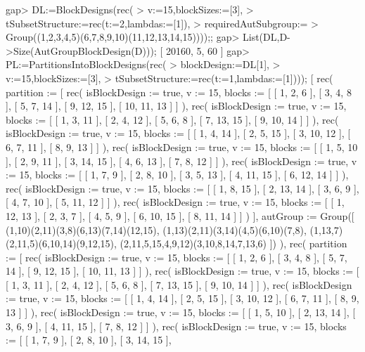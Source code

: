 \beginexample
gap> DL:=BlockDesigns(rec(
>    v:=15,blockSizes:=[3],
>    tSubsetStructure:=rec(t:=2,lambdas:=[1]),
>    requiredAutSubgroup:=
>       Group((1,2,3,4,5)(6,7,8,9,10)(11,12,13,14,15))));;
gap> List(DL,D->Size(AutGroupBlockDesign(D)));
[ 20160, 5, 60 ]
gap> PL:=PartitionsIntoBlockDesigns(rec(
>       blockDesign:=DL[1],
>       v:=15,blockSizes:=[3],
>       tSubsetStructure:=rec(t:=1,lambdas:=[1])));
[ rec( 
      partition := [ rec( isBlockDesign := true, v := 15, blocks := [ [ 1, 2, 
                      6 ], [ 3, 4, 8 ], [ 5, 7, 14 ], [ 9, 12, 15 ], 
                  [ 10, 11, 13 ] ] ), 
          rec( isBlockDesign := true, v := 15, blocks := 
                [ [ 1, 3, 11 ], [ 2, 4, 12 ], [ 5, 6, 8 ], [ 7, 13, 15 ], 
                  [ 9, 10, 14 ] ] ), 
          rec( isBlockDesign := true, v := 15, blocks := 
                [ [ 1, 4, 14 ], [ 2, 5, 15 ], [ 3, 10, 12 ], [ 6, 7, 11 ], 
                  [ 8, 9, 13 ] ] ), 
          rec( isBlockDesign := true, v := 15, blocks := 
                [ [ 1, 5, 10 ], [ 2, 9, 11 ], [ 3, 14, 15 ], [ 4, 6, 13 ], 
                  [ 7, 8, 12 ] ] ), 
          rec( isBlockDesign := true, v := 15, blocks := 
                [ [ 1, 7, 9 ], [ 2, 8, 10 ], [ 3, 5, 13 ], [ 4, 11, 15 ], 
                  [ 6, 12, 14 ] ] ), 
          rec( isBlockDesign := true, v := 15, blocks := 
                [ [ 1, 8, 15 ], [ 2, 13, 14 ], [ 3, 6, 9 ], [ 4, 7, 10 ], 
                  [ 5, 11, 12 ] ] ), 
          rec( isBlockDesign := true, v := 15, blocks := 
                [ [ 1, 12, 13 ], [ 2, 3, 7 ], [ 4, 5, 9 ], [ 6, 10, 15 ], 
                  [ 8, 11, 14 ] ] ) ], 
      autGroup := Group([ (1,10)(2,11)(3,8)(6,13)(7,14)(12,15), 
          (1,13)(2,11)(3,14)(4,5)(6,10)(7,8), 
          (1,13,7)(2,11,5)(6,10,14)(9,12,15), 
          (2,11,5,15,4,9,12)(3,10,8,14,7,13,6) ]) ), 
  rec( partition := [ rec( isBlockDesign := true, v := 15, 
              blocks := [ [ 1, 2, 6 ], [ 3, 4, 8 ], [ 5, 7, 14 ], 
                  [ 9, 12, 15 ], [ 10, 11, 13 ] ] ), 
          rec( isBlockDesign := true, v := 15, 
              blocks := [ [ 1, 3, 11 ], [ 2, 4, 12 ], [ 5, 6, 8 ], 
                  [ 7, 13, 15 ], [ 9, 10, 14 ] ] ), 
          rec( isBlockDesign := true, v := 15, 
              blocks := [ [ 1, 4, 14 ], [ 2, 5, 15 ], [ 3, 10, 12 ], 
                  [ 6, 7, 11 ], [ 8, 9, 13 ] ] ), 
          rec( isBlockDesign := true, v := 15, 
              blocks := [ [ 1, 5, 10 ], [ 2, 13, 14 ], [ 3, 6, 9 ], 
                  [ 4, 11, 15 ], [ 7, 8, 12 ] ] ), 
          rec( isBlockDesign := true, v := 15, 
              blocks := [ [ 1, 7, 9 ], [ 2, 8, 10 ], [ 3, 14, 15 ], 
